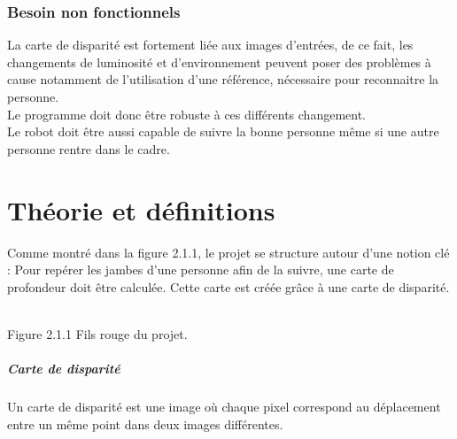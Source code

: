 \documentclass[12pt,a4paper]{report}
\begin{document}
\subsection{Besoin non fonctionnels}
	La carte de disparité est fortement liée aux images d'entrées, de ce fait, les changements de luminosité et d'environnement peuvent poser des problèmes à cause notamment de l'utilisation d'une référence, nécessaire pour reconnaitre la personne.\\
	Le programme doit donc être robuste à ces différents changement.\\
	Le robot doit être aussi capable de suivre la bonne personne même si une autre personne rentre dans le cadre.
	
\chapter{Théorie et définitions}

Comme montré dans la figure 2.1.1, le projet se structure autour d'une notion clé : Pour repérer les jambes d'une personne afin de la suivre, une carte de profondeur doit être calculée. Cette carte est créée grâce à une carte de disparité. 

\begin{center}
\\
Figure 2.1.1 Fils rouge du projet.
\end{center}

\paragraph{Carte de disparité}
Un carte de disparité est une image où chaque pixel correspond au déplacement entre un même point dans deux images différentes. 
\end{document}
